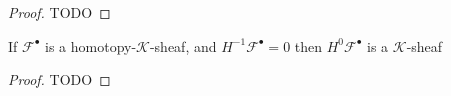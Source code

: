 \begin{proof}
    TODO
\end{proof}

\begin{lemma}\label{lem:first_non_zero_homology_of_homotopy_k_sheaf_is_k_sheaf}
    If $\mathcal{F}^{\bullet}$ is a homotopy-$\mathcal{K}$-sheaf, and $H^{-1}\mathcal{F}^{\bullet}=0$ then $H^{0}\mathcal{F}^{\bullet}$ is a $\mathcal{K}$-sheaf
\end{lemma}

\begin{proof}
    TODO
\end{proof}



